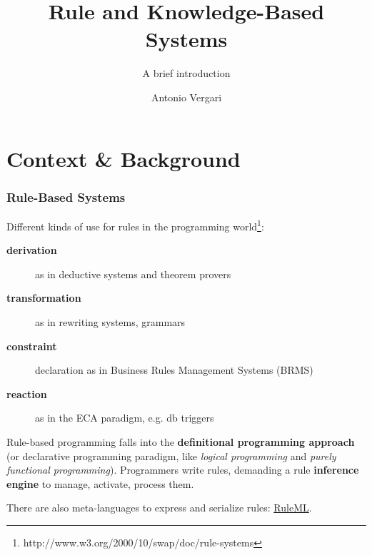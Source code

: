 \documentclass[xcolor={usenames,dvipsnames,svgnames}, compress]{beamer}
\begin{document}
\title{Rule and Knowledge-Based Systems}
\subtitle{A brief introduction}
\author{Antonio Vergari}


\footnotesize \let\small\footnotesize





{
  \begin{frame}
    \titlepage
  \end{frame}
}


\section{Context \& Background}
{
  \begin{frame}
    \sectionpage
  \end{frame}
}

\begin{frame}
  \frametitle{Rule-Based Systems}
  
  Different kinds of use for rules in the programming world\footnote{http://www.w3.org/2000/10/swap/doc/rule-systems}:
  \begin{description}
  \item[\textbf{derivation}] as in deductive systems and theorem provers
  \item[\textbf{transformation}] as in rewriting systems, grammars
  \item[\textbf{constraint}] declaration as in Business Rules Management Systems (BRMS)
  \item[\textbf{reaction}] as in the \textsf{ECA} paradigm, e.g. db triggers
  \end{description}\bigskip
  
  
  Rule-based programming falls into the \textbf{definitional programming
    approach} (or declarative programming paradigm, like \emph{logical programming} and
  \emph{purely functional programming}). Programmers write rules,
  demanding a rule \textbf{inference engine} to manage, activate,
  process them.\par\bigskip
  
  There are also meta-languages to express and serialize rules: \href{http://wiki.ruleml.org/index.php/RuleML_Home}{\textsf{RuleML}}.
\end{frame}
\end{document}
